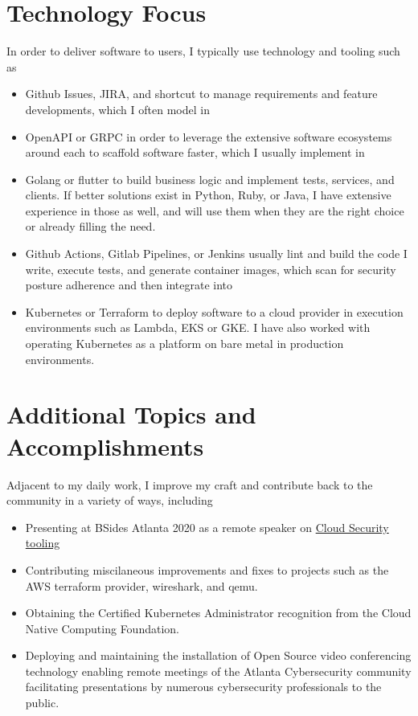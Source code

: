\documentclass[letterpaper,11pt]{article}
\begin{document}
\section{Technology Focus}
In order to deliver software to users, I typically use technology and tooling such as
\begin{itemize}
\item Github Issues, JIRA, and shortcut to manage requirements and feature developments, which I often model in
\item OpenAPI or GRPC in order to leverage the extensive software ecosystems around each to scaffold software faster, which I usually implement in
\item Golang or flutter to build business logic and implement tests, services, and clients. If better solutions exist in Python, Ruby, or Java, I have extensive experience in those as well, and will use them when they are the right choice or already filling the need.
\item Github Actions, Gitlab Pipelines, or Jenkins usually lint and build the code I write, execute tests, and generate container images, which scan for security posture adherence and then integrate into
\item Kubernetes or Terraform to deploy software to a cloud provider in execution environments such as Lambda, EKS or GKE. I have also worked with operating Kubernetes as a platform on bare metal in production environments.
\end{itemize}

\section{Additional Topics and Accomplishments}
Adjacent to my daily work, I improve my craft and contribute back to the community in a variety of ways, including
\begin{itemize}
	\item Presenting at BSides Atlanta 2020 as a remote speaker on \href{https://www.youtube.com/watch?v=kLCaAaUd1mM}{\color{blue}Cloud Security tooling}
	\item Contributing miscilaneous improvements and fixes to projects such as the AWS terraform provider, wireshark, and qemu.
	\item Obtaining the Certified Kubernetes Administrator recognition from the Cloud Native Computing Foundation.
  \item Deploying and maintaining the installation of Open Source video conferencing technology enabling remote meetings of the Atlanta Cybersecurity community facilitating presentations by numerous cybersecurity professionals to the public.
\end{itemize}
\end{document}
